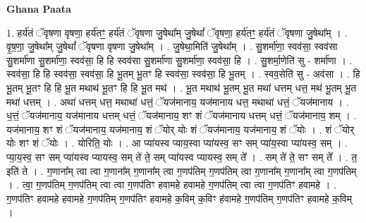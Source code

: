 \documentclass[17pt]{extarticle}
\begin{document}
\textbf{Ghana Paata } \newline

1. हर्य॑तं ॅवृषणा वृषणा॒ हर्य॑तꣳ॒॒ हर्य॑तं ॅवृषणा जु॒षेथा᳚म् जु॒षेथां᳚ ॅवृषणा॒ हर्य॑तꣳ॒॒ हर्य॑तं ॅवृषणा जु॒षेथा᳚म् । . वृ॒ष॒णा॒ जु॒षेथा᳚म् जु॒षेथां᳚ ॅवृषणा वृषणा जु॒षेथा᳚म् । . जु॒षेथा॒मिति॑ जु॒षेथा᳚म् । . सु॒शर्मा॑णा॒ स्वव॑सा॒ स्वव॑सा सु॒शर्मा॑णा सु॒शर्मा॑णा॒ स्वव॑सा॒ हि हि स्वव॑सा सु॒शर्मा॑णा सु॒शर्मा॑णा॒ स्वव॑सा॒ हि । . सु॒शर्मा॒णेति॑ सु - शर्मा॑णा । . स्वव॑सा॒ हि हि स्वव॑सा॒ स्वव॑सा॒ हि भू॒तम् भू॒तꣳ हि स्वव॑सा॒ स्वव॑सा॒ हि भू॒तम् । . स्वव॒सेति॑ सु - अव॑सा । . हि भू॒तम् भू॒तꣳ हि हि भू॒त मथाथ॑ भू॒तꣳ हि हि भू॒त मथ॑ । . भू॒त मथाथ॑ भू॒तम् भू॒त मथा॑ धत्तम् धत्त॒ मथ॑ भू॒तम् भू॒त मथा॑ धत्तम् । . अथा॑ धत्तम् धत्त॒ मथाथा॑ धत्तं॒ ॅयज॑मानाय॒ यज॑मानाय धत्त॒ मथाथा॑ धत्तं॒ ॅयज॑मानाय । . ध॒त्तं॒ ॅयज॑मानाय॒ यज॑मानाय धत्तम् धत्तं॒ ॅयज॑मानाय॒ शꣳ शं ॅयज॑मानाय धत्तम् धत्तं॒ ॅयज॑मानाय॒ शम् । . यज॑मानाय॒ शꣳ शं ॅयज॑मानाय॒ यज॑मानाय॒ शं ॅयोर् योः शं ॅयज॑मानाय॒ यज॑मानाय॒ शं ॅयोः । . शं ॅयोर् योः शꣳ शं ॅयोः । . योरिति॒ योः । . आ प्या॑यस्व प्याय॒स्वा प्या॑यस्व॒ सꣳ सम् प्या॑य॒स्वा प्या॑यस्व॒ सम् । . प्या॒य॒स्व॒ सꣳ सम् प्या॑यस्व प्यायस्व॒ सम् ते॑ ते॒ सम् प्या॑यस्व प्यायस्व॒ सम् ते᳚ । . सम् ते॑ ते॒ सꣳ सम् ते᳚ । . त॒ इति॑ ते । . ग॒णाना᳚म् त्वा त्वा ग॒णाना᳚म् ग॒णाना᳚म् त्वा ग॒णप॑तिम् ग॒णप॑तिम् त्वा ग॒णाना᳚म् ग॒णाना᳚म् त्वा ग॒णप॑तिम् । . त्वा॒ ग॒णप॑तिम् ग॒णप॑तिम् त्वा त्वा ग॒णप॑तिꣳ हवामहे हवामहे ग॒णप॑तिम् त्वा त्वा ग॒णप॑तिꣳ हवामहे । . ग॒णप॑तिꣳ हवामहे हवामहे ग॒णप॑तिम् ग॒णप॑तिꣳ हवामहे क॒विम् क॒विꣳ ह॑वामहे ग॒णप॑तिम् ग॒णप॑तिꣳ हवामहे क॒विम् । \newline
\end{document}
